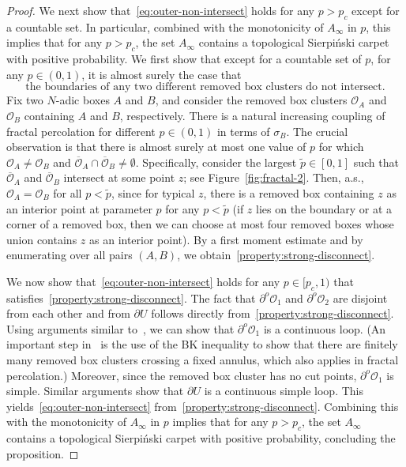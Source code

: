 \documentclass[a4paper]{article}
\numberwithin{equation}{section}
\numberwithin{equation}{section}
\renewcommand{\1}{\mathbf{1}}
\begin{document}
\begin{proof}
    We next show that~\eqref{eq:outer-non-intersect} holds for any $p>p_c$ except for a countable set. In particular, combined with the monotonicity of $A_\infty$ in $p$, this implies that for any $p>p_c$, the set $A_\infty$ contains a topological Sierpi\'nski carpet with positive probability. We first show that except for a countable set of $p$, for any $p \in (0,1)$, it is almost surely the case that
    \begin{equation}\label{property:strong-disconnect}
        \mbox{the boundaries of any two different removed box clusters do not intersect.}
    \end{equation}
    Fix two $N$-adic boxes $A$ and $B$, and consider the removed box clusters $\mathcal{O}_A$ and $\mathcal{O}_B$ containing $A$ and $B$, respectively. There is a natural increasing coupling of fractal percolation for different $p \in (0,1)$ in terms of $\sigma_B$. The crucial observation is that there is almost surely at most one value of $p$ for which $\mathcal{O}_A \neq \mathcal{O}_B$ and $\overline{\mathcal{O}}_A \cap \overline{\mathcal{O}}_B \neq \emptyset$. Specifically, consider the largest $\widetilde p \in [0,1]$ such that $\overline{\mathcal{O}}_A$ and $\overline{\mathcal{O}}_B $ intersect at some point $z$; see Figure~\ref{fig:fractal-2}. Then, a.s., $\mathcal{O}_A = \mathcal{O}_B$ for all $p < \widetilde p$, since for typical $z$, there is a removed box containing $z$ as an interior point at parameter $p$ for any $p<\widetilde p$ (if $z$ lies on the boundary or at a corner of a removed box, then we can choose at most four removed boxes whose union contains $z$ as an interior point).
    By a first moment estimate and by enumerating over all pairs $(A,B)$, we obtain~\eqref{property:strong-disconnect}.

    We now show that~\eqref{eq:outer-non-intersect} holds for any $p \in [p_c,1)$ that satisfies~\eqref{property:strong-disconnect}. The fact that $\partial^o \mathcal{O}_1$ and $\partial^o \mathcal{O}_2$ are disjoint from each other and from $\partial U$ follows directly from~\eqref{property:strong-disconnect}. Using arguments similar to~\cite[Lemma 9.7]{SW-CLE}, we can show that $\partial^o \mathcal{O}_1$ is a continuous loop. (An important step in~\cite[Lemma 9.6]{SW-CLE} is the use of the BK inequality to show that there are finitely many removed box clusters crossing a fixed annulus, which also applies in fractal percolation.) Moreover, since the removed box cluster has no cut points, $\partial^o \mathcal{O}_1$ is simple. Similar arguments show that $\partial U$ is a continuous simple loop. This yields~\eqref{eq:outer-non-intersect} from~\eqref{property:strong-disconnect}. Combining this with the monotonicity of $A_\infty$ in $p$ implies that for any $p>p_c$, the set $A_\infty$ contains a topological Sierpi\'nski carpet with positive probability, concluding the proposition. \qedhere


\end{proof}
\end{document}
